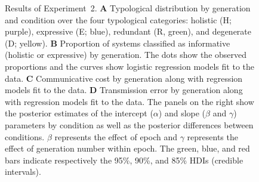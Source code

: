 \documentclass[doc,biblatex]{apa7}
\begin{document}
	\begin{figure}
	\vspace*{2pt}
	\caption{Results of Experiment~2. \textbf{A} Typological distribution by generation and condition over the four typological categories: holistic (H; purple), expressive (E; blue), redundant (R, green), and degenerate (D; yellow). \textbf{B} Proportion of systems classified as informative (holistic or expressive) by generation. The dots show the observed proportions and the curves show logistic regression models fit to the data. \textbf{C} Communicative cost by generation along with regression models fit to the data. \textbf{D} Transmission error by generation along with regression models fit to the data. The panels on the right show the posterior estimates of the intercept ($\alpha$) and slope ($\beta$ and $\gamma$) parameters by condition as well as the posterior differences between conditions. $\beta$ represents the effect of epoch and $\gamma$ represents the effect of generation number within epoch. The green, blue, and red bars indicate respectively the 95\%, 90\%, and 85\% HDIs (credible intervals).}
	\label{fig11}
	\end{figure}
\end{document}
